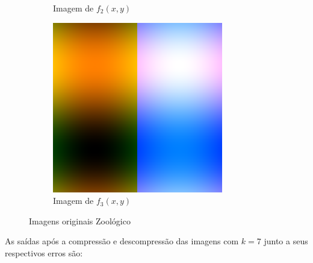 \documentclass[12pt, a4paper]{article}
\begin{document}
\begin{figure}[h]
\begin{subfigure}{.3\textwidth}
            \caption{Imagem de $f_2(x,y)$}
        \end{subfigure}
        \begin{subfigure}{.3\textwidth}
            \includegraphics[width=.95\textwidth]{../trdFun.png}
            \caption{Imagem de $f_3(x,y)$}
        \end{subfigure}
        \caption{Imagens originais Zoológico}
    \end{figure}
    As saídas após a compressão e descompressão das imagens com $k=7$ junto a
    seus respectivos erros são:
\end{document}
